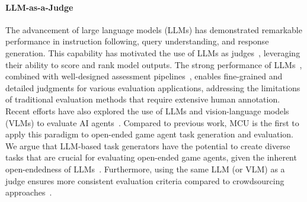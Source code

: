 \paragraph{LLM-as-a-Judge} 
The advancement of large language models (LLMs) has demonstrated remarkable performance in instruction following, query understanding, and response generation. This capability has motivated the use of LLMs as judges~\citep{llm-judge-mtbench}, leveraging their ability to score and rank model outputs. The strong performance of LLMs~\citep{brown2020language}, combined with well-designed assessment pipelines~\citep{li2023prd,beigi2024model,bai2024benchmarking}, enables fine-grained and detailed judgments for various evaluation applications, addressing the limitations of traditional evaluation methods that require extensive human annotation. Recent efforts have also explored the use of LLMs and vision-language models (VLMs) to evaluate AI agents~\citep{mobile-pan,zhuge2024agent}. Compared to previous work, MCU is the first to apply this paradigm to open-ended game agent task generation and evaluation. We argue that LLM-based task generators have the potential to create diverse tasks that are crucial for evaluating open-ended game agents, given the inherent open-endedness of LLMs~\citep{hughes2024open}. Furthermore, using the same LLM (or VLM) as a judge ensures more consistent evaluation criteria compared to crowdsourcing approaches~\citep{web-env-autoagent}.